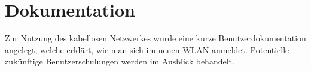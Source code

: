 \section{Dokumentation}
\label{sec:Dokumentation}
Zur Nutzung des kabellosen Netzwerkes wurde eine kurze Benutzerdokumentation angelegt, welche erklärt, wie man sich im neuen WLAN anmeldet. Potentielle zukünftige Benutzerschulungen werden im Ausblick behandelt.


